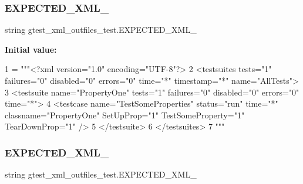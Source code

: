 \subsubsection{\texorpdfstring{E\+X\+P\+E\+C\+T\+E\+D\+\_\+\+X\+M\+L\+\_}{EXPECTED\_XML\_1}}
{\footnotesize\ttfamily string gtest\+\_\+xml\+\_\+outfiles\+\_\+test.\+E\+X\+P\+E\+C\+T\+E\+D\+\_\+\+X\+M\+L\+\_}

{\bfseries Initial value\+:}
\begin{DoxyCode}
1 =  \textcolor{stringliteral}{"""<?xml version="1.0" encoding="UTF-8"?>}
2 \textcolor{stringliteral}{<testsuites tests="1" failures="0" disabled="0" errors="0" time="*" timestamp="*" name="AllTests">}
3 \textcolor{stringliteral}{  <testsuite name="PropertyOne" tests="1" failures="0" disabled="0" errors="0" time="*">}
4 \textcolor{stringliteral}{    <testcase name="TestSomeProperties" status="run" time="*" classname="PropertyOne" SetUpProp="1"
       TestSomeProperty="1" TearDownProp="1" />}
5 \textcolor{stringliteral}{  </testsuite>}
6 \textcolor{stringliteral}{</testsuites>}
7 \textcolor{stringliteral}{"""}
\end{DoxyCode}
\mbox{\label{namespacegtest__xml__outfiles__test_a765455244a8cd7b3f32a51f0cda4157e}} 
\subsubsection{\texorpdfstring{E\+X\+P\+E\+C\+T\+E\+D\+\_\+\+X\+M\+L\+\_}{EXPECTED\_XML\_2}}
{\footnotesize\ttfamily string gtest\+\_\+xml\+\_\+outfiles\+\_\+test.\+E\+X\+P\+E\+C\+T\+E\+D\+\_\+\+X\+M\+L\+\_}

